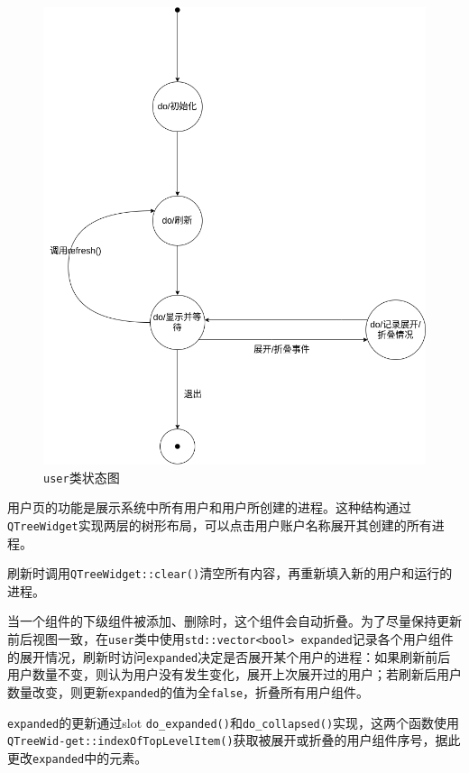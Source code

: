 \documentclass[UTF8,twoside,titlepage]{ctexart}
\newcommand\code[1]{\texttt{#1}}
\begin{document}
\begin{figure}[htb]
    \centering
    \includegraphics[scale=0.38]{../dia/user.png}
    \caption{\code{user}类状态图}
    \label{fig:userstat}
\end{figure}

用户页的功能是展示系统中所有用户和用户所创建的进程。这种结构通过\code{QTreeWidget}实现两层的树形布局，可以点击用户账户名称展开其创建的所有进程。

刷新时调用\code{QTreeWidget::clear()}清空所有内容，再重新填入新的用户和运行的进程。

当一个组件的下级组件被添加、删除时，这个组件会自动折叠。为了尽量保持更新前后视图一致，在\code{user}类中使用\code{std::vector<bool> expanded}记录各个用户组件的展开情况，刷新时访问\code{expanded}决定是否展开某个用户的进程：如果刷新前后用户数量不变，则认为用户没有发生变化，展开上次展开过的用户；若刷新后用户数量改变，则更新\code{expanded}的值为全\code{false}，折叠所有用户组件。

\code{expanded}的更新通过slot \code{do\_expanded()}和\code{do\_collapsed()}实现，这两个函数使用\code{QTreeWid-\linebreak get::indexOfTopLevelItem()}获取被展开或折叠的用户组件序号，据此更改\code{expanded}中的元素。
\end{document}
